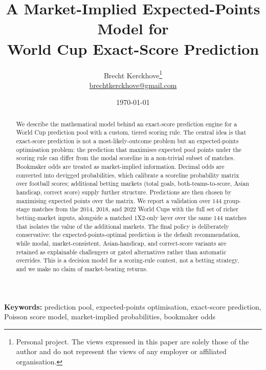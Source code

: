 \documentclass[11pt]{article}
\begin{document}
\author{Brecht Kerckhove\thanks{Personal project. The views expressed in this paper are solely those of the author and do not represent the views of any employer or affiliated organisation.} \\ \href{mailto:brechtkerckhove@gmail.com}{brechtkerckhove@gmail.com}}
\date{\today}
\title{A Market-Implied Expected-Points Model for\\ World Cup Exact-Score Prediction}
\maketitle

\begin{abstract}
We describe the mathematical model behind an exact-score prediction engine for a
World Cup prediction pool with a custom, tiered scoring rule. The central idea is
that exact-score prediction is not a most-likely-outcome problem but an
expected-points optimisation problem: the prediction that maximises expected
pool points under the scoring rule can differ from the modal scoreline in a
non-trivial subset of matches. Bookmaker odds are treated as market-implied information. Decimal odds are converted into devigged probabilities, which calibrate a scoreline probability matrix over football scores; additional betting markets (total goals, both-teams-to-score, Asian handicap, correct score) supply further structure. Predictions are then chosen by maximising expected points over the matrix. We report a validation over $144$ group-stage matches from the 2014, 2018, and 2022 World Cups with the full set of richer betting-market inputs, alongside a matched 1X2-only layer over the same $144$ matches that isolates the value of the additional markets. The final policy is deliberately conservative: the expected-points-optimal prediction is the default recommendation, while modal, market-consistent, Asian-handicap, and correct-score variants are retained as explainable challengers or gated alternatives rather than automatic overrides. This is a decision model for a scoring-rule contest, not a betting strategy, and we make no claim of market-beating returns.
\end{abstract}

\textbf{Keywords:} prediction pool, expected-points optimisation, exact-score prediction, Poisson score model, market-implied probabilities, bookmaker odds


\end{document}
